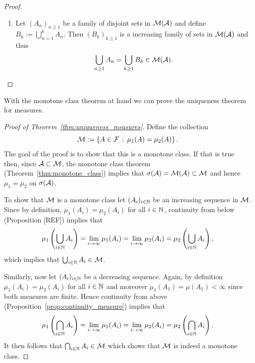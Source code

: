 \begin{proof}
\begin{enumerate}
\begin{enumerate}[label=\arabic*.]
Let $(A_n)_{n \ge 1}$ be an increasing family in $\overline{\cM}(\cA)$ and define $B_n = A_n^c$. Then $(B_n)_{n \ge 1}$ is a decreasing family in $\cM(\cA)$ and thus
\[
	\left(\bigcup_{n \ge 1} A_n \right)^c = \bigcap_{n \ge 1} A_n^c = \bigcap_{n \ge 1} B_n \in \cM(\cA),
\]
from which it follows that $\bigcup_{n \ge 1} A_n \in \overline{\cM}(\cA)$.
\item Let $(A_n)_{n \ge 1}$ be a family of disjoint sets in $\cM(\cA)$ and define $B_k := \bigcup_{n = 1}^k A_n$. Then $(B_k)_{k \ge 1}$ is a increasing family of sets in $\cM(\cA)$ and thus
\[
	\bigcup_{n \ge 1} A_n = \bigcup_{k \ge 1} B_k \in \mathcal M(\mathcal A).
\]
\end{enumerate}

  
\end{enumerate}
\end{proof}

With the monotone class theorem at hand we can prove the uniqueness theorem for measures.

\begin{proof}[Proof of Theorem~\ref{thm:uniqueness_measures}]
Define the collection
\[
	\mathcal M := \left\{A \in \mathcal F \, : \, \mu_1(A) = \mu_2(A)\right\}.
\]
The goal of the proof is to show that this is a monotone class. If that is true then, since $\mathcal A \subset \mathcal M$, the monotone class theorem (Theorem~\ref{thm:monotone_class}) implies that $\sigma(\mathcal A) = \mathcal M(\mathcal A) \subset \mathcal M$ and hence $\mu_1 = \mu_2$ on $\sigma(\mathcal A)$.

To show that $\mathcal M$ is a monotone class let $(A_i)_{i \in \mathbb N}$ be an increasing sequence in $\mathcal M$. Since by definition, $\mu_1(A_i) = \mu_2(A_i)$ for all $i \in \mathbb N$, continuity from below (Proposition [REF]) implies that
\[
	\mu_1\left(\bigcup_{i \in \mathbb N} A_i\right) = \lim_{i \to \infty} \mu_1(A_i) 
	= \lim_{i \to \infty} \mu_2(A_i) = \mu_2\left(\bigcup_{i \in \mathbb N} A_i\right),
\]
which implies that $\bigcup_{i \in \mathbb N} A_i \in \mathcal M$.

Similarly, now let $(A_i)_{i \in \mathbb N}$ be a decreasing sequence. Again, by definition $\mu_1(A_i) = \mu_2(A_i)$ for all $i \in \mathbb N$ and moreover $\mu_1(A_1) = \mu(A_1) < \infty$ since both measures are finite. Hence continuity from above (Proposition~\ref{prop:continuity_measure}) implies that
\[
	\mu_1\left(\bigcap_{i \in \mathbb N} A_i\right) = \lim_{i \to \infty} \mu_1(A_i) 
	= \lim_{i \to \infty} \mu_2(A_i) = \mu_2\left(\bigcap_{i \in \mathbb N} A_i\right).
\]
It then follows that $\bigcap_{i \in \mathbb N} A_i \in \mathcal M$ which shows that $\mathcal M$ is indeed a monotone class.
\end{proof}

